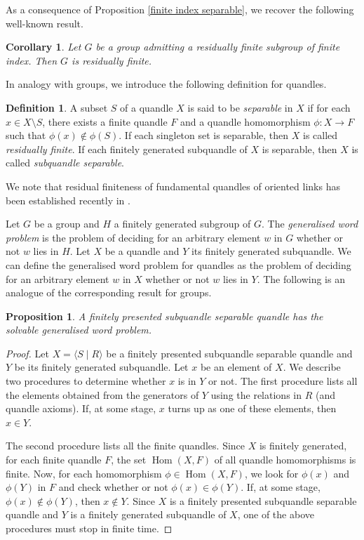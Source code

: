 \documentclass[12pt]{amsart}
\newtheorem{corollary}[theorem]{Corollary}
\newtheorem{prop}[theorem]{Proposition}
\theoremstyle{definition}
\newtheorem{definition}[theorem]{Definition}
\numberwithin{equation}{subsection}
\newcommand{\Hom}{\operatorname{Hom}}
\begin{document}
As a consequence of Proposition \ref{finite index separable}, we recover the following well-known result.

\begin{corollary}\label{finite index res finite}
Let $G$ be a group admitting a residually finite subgroup of finite index. Then $G$ is residually finite.
\end{corollary}

In analogy with groups, we introduce the following definition for quandles.

\begin{definition}
A subset $S$ of a quandle $X$ is said to be {\it separable} in $X$  if for each $x \in X\setminus S$, there exists a finite quandle $F$ and a quandle homomorphism $\phi : X \rightarrow F$ such that $\phi(x) \notin \phi(S)$. If each singleton set is separable, then $X$ is called {\it residually finite}. If each finitely generated subquandle of $X$ is separable, then $X$ is called  {\it subquandle separable}.
\end{definition}

We note that residual finiteness of fundamental quandles of oriented links has been established recently in \cite{MR3981139, MR4075375}. 
\par

Let $G$ be a group and $H$ a finitely generated subgroup of $G$. The {\it generalised word problem} is the problem of deciding for an arbitrary element $w$ in $G$ whether or not $w$ lies in $H$. Let $X$ be a quandle and $Y$ its  finitely generated subquandle. We can define the generalised word problem for quandles as the problem of  deciding for an arbitrary element $w$ in $X$ whether or not $w$ lies in $Y$. The following is an analogue of the corresponding result for groups.

\begin{prop}
A finitely presented subquandle separable  quandle has the solvable generalised word problem.
\end{prop}

\begin{proof}
Let $X=\langle S \mid R \rangle$ be a finitely presented subquandle separable quandle and $Y$ be its finitely generated subquandle. Let $x$ be an element of $X$. We describe two procedures to determine whether $x$ is in $Y$ or not. The first procedure lists all the elements obtained from the generators of $Y$ using the relations in $R$ (and quandle axioms). If, at some stage,  $x$ turns up as one of these elements, then $x \in Y$.
\par
The second procedure lists all the finite quandles. Since $X$ is finitely generated, for each finite quandle $F$, the set $\Hom(X, F)$ of all quandle homomorphisms is finite. Now, for each homomorphism $\phi \in \Hom(X, F)$, we look for $\phi(x)$ and $\phi(Y)$ in $F$ and check whether or not $\phi(x) \in \phi(Y)$. If, at some stage, $\phi(x)\notin \phi(Y)$, then $x\notin Y$. Since $X$ is a finitely presented subquandle separable quandle and $Y$ is a finitely generated subquandle of $X$, one of the above procedures must stop in finite time.
\end{proof}
\end{document}
